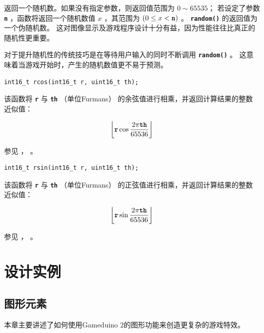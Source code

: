 \documentclass[10pt]{book}
\newcommand{\mach}[1]{\texttt{\textbf{#1}}}
\begin{document}
\begin{CJK}{UTF8}{gkai}
返回一个随机数。如果没有指定参数，则返回值范围为 $0\sim65535$；
若设定了参数 \mach{n} ，函数将返回一个随机数值 $x$ ，其范围为 $(0 \le x < \mach{n})$ 。
\mach{random()} 的返回值为一个伪随机数。
这对图像显示及游戏程序设计十分有益，因为性能往往比真正的随机性更重要。

对于提升随机性的传统技巧是在等待用户输入的同时不断调用 \mach{random()} 。
这意味着当游戏开始时，产生的随机数值更不易于预测。

\newpage
{}

\begin{framed}
\begin{verbatim}
int16_t rcos(int16_t r, uint16_t th);
\end{verbatim}
\end{framed}

该函数将 \mach{r} 与 \mach{th} （单位Furmans） 的余弦值进行相乘，并返回计算结果的整数近似值：

\[
  \left\lfloor \mach{r} \cos \frac{2 \pi \mach{th}}{65536} \right\rfloor
\]

\noindent
参见  ，  。


\begin{framed}
\begin{verbatim}
int16_t rsin(int16_t r, uint16_t th);
\end{verbatim}
\end{framed}

该函数将 \mach{r} 与 \mach{th} （单位Furmans） 的正弦值进行相乘，并返回计算结果的整数近似值：

\[
  \left\lfloor \mach{r} \sin \frac{2 \pi \mach{th}}{65536} \right\rfloor
\]

\noindent
参见  ，  。

\part{设计实例}

\chapter{图形元素}

本章主要讲述了如何使用Gameduino 2的图形功能来创造更复杂的游戏特效。

\newpage

\end{CJK}
\end{document}
